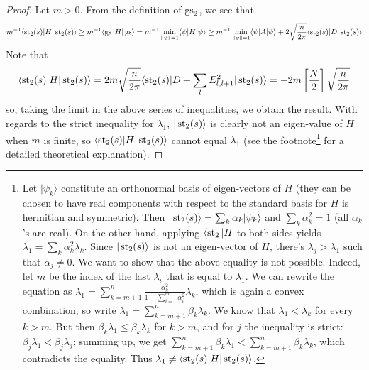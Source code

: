 \begin{proof}
Let $m > 0$. From the definition of $\operatorname{gs}_2$, we see that
\[
m^{-1}\langle \operatorname{st}_2(s) | H| \operatorname{st}_2(s) \rangle \geq m^{-1}\langle \operatorname{gs} | H| \operatorname{gs} \rangle = m^{-1}\min_{\|\psi\|=1} \langle \psi |H|\psi\rangle \geq m^{-1}\min_{\|\psi\|=1} \langle \psi |A |\psi\rangle + 2\sqrt{\frac{n}{2\pi}} \langle \operatorname{st}_2(s) | D| \operatorname{st}_2(s)\rangle 
\]
Note that
\[
\langle \operatorname{st}_2(s) | H|\operatorname{st}_2(s) \rangle = 2m\sqrt{\frac{n}{2\pi}} \langle \operatorname{st}_2(s) | D + \sum_l E_{l,l+1}^2 | \operatorname{st}_2(s)\rangle = -2m\left[\frac{N}{2}\right]\sqrt{\frac{n}{2\pi}}
\]
so, taking the limit in the above series of inequalities, we obtain the result.
With regards to the strict inequality for $\lambda_1$, $|\operatorname{st}_2(s)\rangle$ is clearly not an eigen-value of $H$ when $m$ is finite, so $\langle\operatorname{st}_2(s)|H|\operatorname{st}_2(s)\rangle$ cannot equal $\lambda_1$ (see the footnote\footnote{Let $|\psi_k\rangle$ constitute an orthonormal basis of eigen-vectors of $H$ (they can be chosen to have real components with respect to the standard basis for $H$ is hermitian and symmetric). Then $|\operatorname{st}_2(s)\rangle = \sum_{k} \alpha_k |\psi_k\rangle$ and $\sum_{k}\alpha_k^2 = 1$ (all $\alpha_k$'s are real). On the other hand, applying $\langle \operatorname{st}_2 |H$ to both sides yields $\lambda_1 = \sum_{k} \alpha_k^2 \lambda_k$. Since $|\operatorname{st}_2(s)\rangle$ is not an eigen-vector of $H$, there's $\lambda_j > \lambda_1$ such that $\alpha_j \neq 0$. We want to show that the above equality is not possible. Indeed, let $m$ be the index of the last $\lambda_i$ that is equal to $\lambda_1$. We can rewrite the equation as $\lambda_1 = \sum_{k=m+1}^n \frac{\alpha_k^2}{1-\sum_{i=1}^m \alpha_i^2} \lambda_k$, which is again a convex combination, so write $\lambda_1 = \sum_{k=m+1}^n \beta_k\lambda_k$. We know that $\lambda_1 < \lambda_{k}$ for every $k> m$. But then $\beta_k\lambda_1 \leq \beta_k\lambda_k$ for $k > m$, and for $j$ the inequality is strict: $\beta_j\lambda_1 < \beta_j\lambda_j$; summing up, we get $\sum_{k=m+1}^n \beta_k\lambda_1 < \sum_{k=m+1}^n \beta_k \lambda_k$, which contradicts the equality. Thus $\lambda_1 \neq \langle \operatorname{st}_2(s)|H|\operatorname{st}_2(s)\rangle$.

} for a detailed theoretical explanation).
\end{proof}
